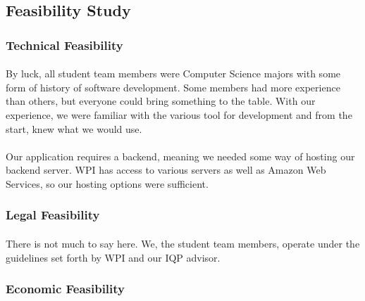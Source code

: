     \newpage
    \subsection{Feasibility Study} %

        \subsubsection{Technical Feasibility}
        
            \paragraph{}
            By luck, all student team members were Computer Science majors with some form of history of software development. Some members had more experience than others, but everyone could bring something to the table. With our experience, we were familiar with the various tool for development and from the start, knew what we would use.
            
            \paragraph{}
            Our application requires a backend, meaning we needed some way of hosting our backend server. WPI has access to various servers as well as Amazon Web Services, so our hosting options were sufficient.
            
        \subsubsection{Legal Feasibility}
        
            \paragraph{}
            There is not much to say here. We, the student team members, operate under the guidelines set forth by WPI and our IQP advisor.
            
        \subsubsection{Economic Feasibility}
        
